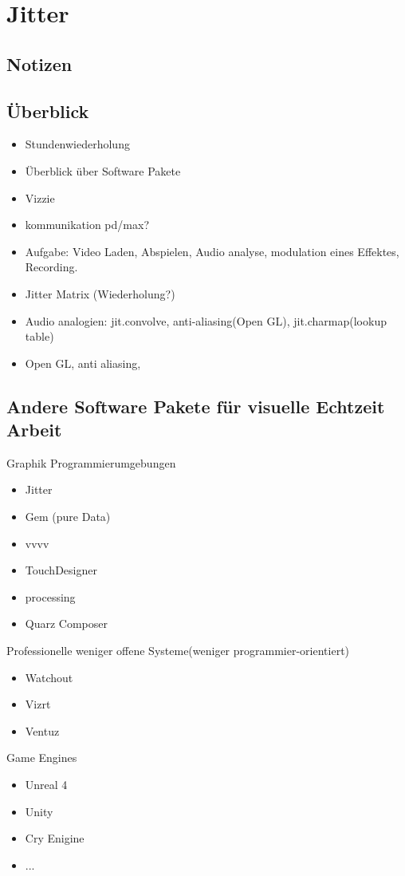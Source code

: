 \chapter{Jitter}
\label{Jitter}
\section{Notizen}
    
\section{Überblick}
\begin{itemize}
	\item Stundenwiederholung
	\item Überblick über Software Pakete
	\item Vizzie
	\item kommunikation pd/max?
	\item Aufgabe: Video Laden, Abspielen, Audio analyse, modulation eines Effektes, Recording.
	\item Jitter Matrix (Wiederholung?)
	\item Audio analogien: jit.convolve, anti-aliasing(Open GL), jit.charmap(lookup table)

	\item Open GL, anti aliasing, 
\end{itemize}

\section{Andere Software Pakete für visuelle Echtzeit Arbeit}
Graphik Programmierumgebungen
\begin{itemize}
	\item Jitter
	\item Gem (pure Data)
	\item vvvv
	\item TouchDesigner
	\item processing
	\item Quarz Composer
\end{itemize}
\glqq{}Professionelle\grqq{} weniger offene Systeme(weniger programmier-orientiert)
\begin{itemize}
	\item Watchout
	\item Vizrt
	\item Ventuz
\end{itemize}
Game Engines
\begin{itemize}
	\item Unreal 4
	\item Unity
	\item Cry Enigine
	\item ...
\end{itemize}



